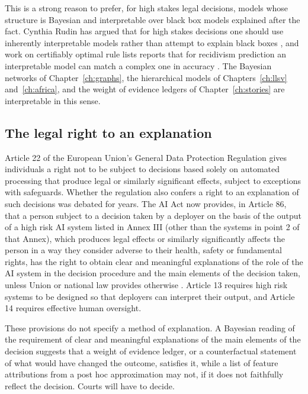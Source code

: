 This is a strong reason to prefer, for high stakes legal decisions, models whose structure is Bayesian and interpretable over black box models explained after the fact. Cynthia Rudin has argued that for high stakes decisions one should use inherently interpretable models rather than attempt to explain black boxes \citep{rudin2019}, and work on certifiably optimal rule lists reports that for recidivism prediction an interpretable model can match a complex one in accuracy \citep{angelino2018}. The Bayesian networks of Chapter~\ref{ch:graphs}, the hierarchical models of Chapters~\ref{ch:llsv} and~\ref{ch:africa}, and the weight of evidence ledgers of Chapter~\ref{ch:stories} are interpretable in this sense.

\subsection{The legal right to an explanation}

Article 22 of the European Union's General Data Protection Regulation gives individuals a right not to be subject to decisions based solely on automated processing that produce legal or similarly significant effects, subject to exceptions with safeguards. Whether the regulation also confers a right to an explanation of such decisions was debated for years. The AI Act now provides, in Article 86, that a person subject to a decision taken by a deployer on the basis of the output of a high risk AI system listed in Annex III (other than the systems in point 2 of that Annex), which produces legal effects or similarly significantly affects the person in a way they consider adverse to their health, safety or fundamental rights, has the right to obtain clear and meaningful explanations of the role of the AI system in the decision procedure and the main elements of the decision taken, unless Union or national law provides otherwise \citep{euaiact2024}. Article 13 requires high risk systems to be designed so that deployers can interpret their output, and Article 14 requires effective human oversight.

These provisions do not specify a method of explanation. A Bayesian reading of the requirement of clear and meaningful explanations of the main elements of the decision suggests that a weight of evidence ledger, or a counterfactual statement of what would have changed the outcome, satisfies it, while a list of feature attributions from a post hoc approximation may not, if it does not faithfully reflect the decision. Courts will have to decide.

